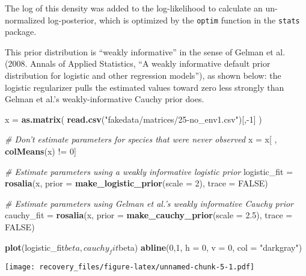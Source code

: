 \documentclass[11pt,]{article}
\newenvironment{Shaded}{\begin{snugshade}}{\end{snugshade}}
\newcommand{\KeywordTok}[1]{\textcolor[rgb]{0.13,0.29,0.53}{\textbf{{#1}}}}
\newcommand{\DataTypeTok}[1]{\textcolor[rgb]{0.13,0.29,0.53}{{#1}}}
\newcommand{\DecValTok}[1]{\textcolor[rgb]{0.00,0.00,0.81}{{#1}}}
\newcommand{\FloatTok}[1]{\textcolor[rgb]{0.00,0.00,0.81}{{#1}}}
\newcommand{\StringTok}[1]{\textcolor[rgb]{0.31,0.60,0.02}{{#1}}}
\newcommand{\CommentTok}[1]{\textcolor[rgb]{0.56,0.35,0.01}{\textit{{#1}}}}
\newcommand{\OtherTok}[1]{\textcolor[rgb]{0.56,0.35,0.01}{{#1}}}
\newcommand{\NormalTok}[1]{{#1}}
\begin{document}
The log of this density was added to the log-likelihood to calculate an
un-normalized log-posterior, which is optimized by the \texttt{optim}
function in the \texttt{stats} package.

This prior distribution is ``weakly informative'' in the sense of Gelman
et al. (2008. Annals of Applied Statistics, ``A weakly informative
default prior distribution for logistic and other regression models''),
as shown below: the logistic regularizer pulls the estimated values
toward zero less strongly than Gelman et al.'s weakly-informative Cauchy
prior does.

\begin{Shaded}
\begin{Highlighting}[]
\NormalTok{x =}\StringTok{ }\KeywordTok{as.matrix}\NormalTok{(}
  \KeywordTok{read.csv}\NormalTok{(}\StringTok{"fakedata/matrices/25-no_env1.csv"}\NormalTok{)[,-}\DecValTok{1}\NormalTok{]}
\NormalTok{)}

\CommentTok{# Don't estimate parameters for species that were never observed}
\NormalTok{x =}\StringTok{ }\NormalTok{x[ , }\KeywordTok{colMeans}\NormalTok{(x) !=}\StringTok{ }\DecValTok{0}\NormalTok{]}


\CommentTok{# Estimate parameters using a weakly informative logistic prior}
\NormalTok{logistic_fit =}\StringTok{ }\KeywordTok{rosalia}\NormalTok{(x, }\DataTypeTok{prior =} \KeywordTok{make_logistic_prior}\NormalTok{(}\DataTypeTok{scale =} \DecValTok{2}\NormalTok{),}
                             \DataTypeTok{trace =} \OtherTok{FALSE}\NormalTok{)}

\CommentTok{# Estimate parameters using Gelman et al.'s weakly informative Cauchy prior}
\NormalTok{cauchy_fit =}\StringTok{ }\KeywordTok{rosalia}\NormalTok{(x, }\DataTypeTok{prior =} \KeywordTok{make_cauchy_prior}\NormalTok{(}\DataTypeTok{scale =} \FloatTok{2.5}\NormalTok{),}
                           \DataTypeTok{trace =} \OtherTok{FALSE}\NormalTok{)}


\KeywordTok{plot}\NormalTok{(logistic_fit$beta, cauchy_fit$beta)}
\KeywordTok{abline}\NormalTok{(}\DecValTok{0}\NormalTok{,}\DecValTok{1}\NormalTok{, }\DataTypeTok{h =} \DecValTok{0}\NormalTok{, }\DataTypeTok{v =} \DecValTok{0}\NormalTok{, }\DataTypeTok{col =} \StringTok{"darkgray"}\NormalTok{)}
\end{Highlighting}
\end{Shaded}

\texttt{[image: recovery\_files/figure-latex/unnamed-chunk-5-1.pdf]}
\end{document}
